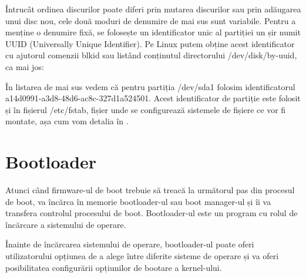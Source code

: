Întrucât ordinea discurilor poate diferi prin mutarea discurilor sau prin
adăugarea unui disc nou, cele două moduri de denumire de mai sus sunt variabile.
Pentru a menține o denumire fixă, se folosește un identificator unic al
partiției un șir numit UUID 
(Universally Unique Identifier). Pe Linux putem obține acest identificator cu
ajutorul comenzii blkid sau listând conținutul directorului /dev/disk/by-uuid,
ca mai jos:


În listarea de mai sus vedem că pentru partiția /dev/sda1 folosim
identificatorul a14d0991-a3d8-48d6-ac8c-327d1a524501. Acest identificator de
partiție este folosit și în fișierul /etc/fstab, fișier unde se configurează
sistemele de fișiere ce vor fi montate, așa cum vom detalia în
.

\section{Bootloader}
\label{sec:boot-bootloader}

Atunci când firmware-ul de boot trebuie să treacă la următorul pas din procesul
de boot, va încărca în memorie bootloader-ul sau boot manager-ul și îi va
transfera controlul procesului de boot. Bootloader-ul este un program cu rolul
de încărcare a sistemului de operare.

Înainte de încărcarea sistemului de operare, bootloader-ul poate oferi
utilizatorului opțiunea de a alege între diferite sisteme de operare și va oferi
posibilitatea configurării opțiunilor de bootare a kernel-ului.

